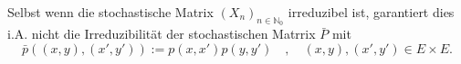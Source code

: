 Selbst wenn die stochastische Matrix $(X_{n})_{n \in \mathbb{N}_{0}}$ irreduzibel ist, garantiert dies i.A. nicht die Irreduzibilität der stochastischen Matrrix $\bar{P}$ mit 
\begin{equation*}
\bar{p} \left( (x,y),(x',y') \right) := p(x,x')p(y,y') \quad , \quad (x,y),(x',y') \in E \times E.
\end{equation*}